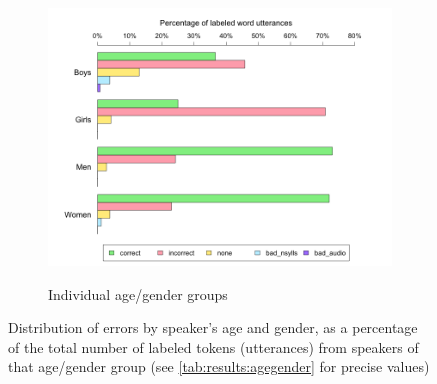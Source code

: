 			
			\begin{figure}[ptb]
				\centering
								
				\begin{subfigure}{\textwidth}
					\centering
					\caption{Individual age/gender groups}
					\includegraphics[width=\textwidth]{img/plots/judgmentsAgeGender}
					\label{fig:agegenderbars:4groups}
				\end{subfigure}
				
				\vspace{1.5em}
				
				\caption[Error distribution by speaker age and gender]{Distribution of errors by speaker's age and gender,
				as a percentage of the total number of labeled tokens (utterances) from speakers of that age/gender group
				(see \cref{tab:results:agegender} for precise values)
				}
				\ContinuedFloat
				
				\label{fig:results:agegenderbars}
			\end{figure}
			
